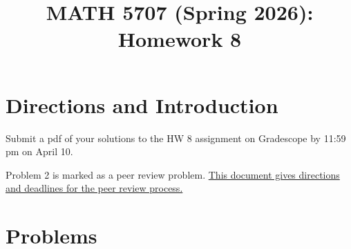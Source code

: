 \documentclass[12pt]{article}
\title{MATH 5707 (Spring 2026): Homework 8}
\date{}
\begin{document}
\vspace{-0.7in}

\maketitle
\vspace{-0.6in}


\section*{Directions and Introduction}
Submit a pdf of your solutions to the HW 8 assignment on Gradescope by 11:59 pm on April 10.

Problem 2 is marked as a peer review problem. \href{https://docs.google.com/document/d/1jSw9pmMJJFUx_6dTkcUi4k4HJNIrrIIgs9zdWhAycx0/edit?usp=sharing}{This document gives directions and deadlines for the peer review process.}



\section*{Problems}
\end{document}

